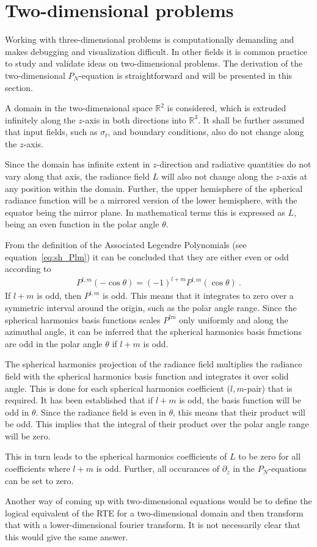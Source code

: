 \section{Two-dimensional problems}
\label{sec:pn_2d}

Working with three-dimensional problems is computationally demanding and makes debugging and visualization difficult. In other fields it is common practice to study and validate ideas on two-dimensional problems. The derivation of the two-dimensional $P_N$-equation is straightforward and will be presented in this section.

A domain in the two-dimensional space $\mathbb{R}^2$ is considered, which is extruded infinitely along the $z$-axis in both directions into $\mathbb{R}^3$. It shall be further assumed that input fields, such as $\sigma_t$, and boundary conditions, also do not change along the $z$-axis.

Since the domain has infinite extent in $z$-direction and radiative quantities do not vary along that axis, the radiance field $L$ will also not change along the $z$-axis at any position within the domain. Further, the upper hemisphere of the spherical radiance function will be a mirrored version of the lower hemisphere, with the equator being the mirror plane. In mathematical terms this is expressed as $L$, being an even function in the polar angle $\theta$.

From the definition of the Associated Legendre Polynomials (see equation~\ref{eq:sh_Plm}) it can be concluded that they are either even or odd according to
\begin{align}
P^{l,m}\left(-\operatorname{cos}\theta\right) = 
\left(-1\right)^{l+m}
P^{l,m}\left(\operatorname{cos}\theta\right)
\ .
\end{align}
If $l+m$ is odd, then $P^{l,m}$ is odd. This means that it integrates to zero over a symmetric interval around the origin, such as the polar angle range. Since the spherical harmonics basis functions scales $P^{lm}$ only uniformly and along the azimuthal angle, it can be inferred that the spherical harmonics basis functions are odd in the polar angle $\theta$ if $l+m$ is odd.

The spherical harmonics projection of the radiance field multiplies the radiance field with the spherical harmonics basis function and integrates it over solid angle. This is done for each spherical harmonics coefficient ($l,m$-pair) that is required. It has been established that if $l+m$ is odd, the basis function will be odd in $\theta$. Since the radiance field is even in $\theta$, this means that their product will be odd. This implies that the integral of their product over the polar angle range will be zero.

This in turn leads to the spherical harmonics coefficients of $L$ to be zero for all coefficients where $l+m$ is odd. Further, all occurances of $\partial_z$ in the $P_N$-equations can be set to zero.

Another way of coming up with two-dimensional equations would be to define the logical equivalent of the RTE for a two-dimensional domain and then transform that with a lower-dimensional fourier transform. It is not necessarily clear that this would give the same answer.